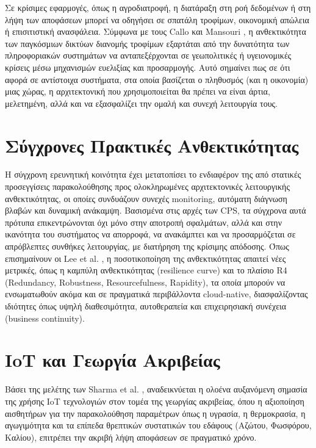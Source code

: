 Σε κρίσιμες εφαρμογές, όπως η αγροδιατροφή, η διατάραξη στη ροή δεδομένων ή στη λήψη των αποφάσεων μπορεί να οδηγήσει σε σπατάλη τροφίμων, οικονομική απώλεια ή επισιτιστική ανασφάλεια. Σύμφωνα με τους Callo και Mansouri \cite{foodsec}, η ανθεκτικότητα των παγκόσμιων δικτύων διανομής τροφίμων εξαρτάται από την δυνατότητα των πληροφοριακών συστημάτων να ανταπεξέρχονται σε γεωπολιτικές ή υγειονομικές κρίσεις μέσω μηχανισμών ευελιξίας και προσαρμογής. Αυτό σημαίνει πως σε ότι αφορά σε αντίστοιχα συστήματα, στα οποία βασίζεται ο πληθυσμός (και η οικονομία) μιας χώρας, η αρχιτεκτονική που χρησιμοποιείται θα πρέπει να είναι άρτια, μελετημένη, αλλά και να εξασφαλίζει την ομαλή και συνεχή λειτουργία τους.

\section{Σύγχρονες Πρακτικές Ανθεκτικότητας}

Η σύγχρονη ερευνητική κοινότητα έχει μετατοπίσει το ενδιαφέρον της από στατικές προσεγγίσεις παρακολούθησης προς ολοκληρωμένες αρχιτεκτονικές λειτουργικής ανθεκτικότητας, οι οποίες συνδυάζουν συνεχές monitoring, αυτόματη διάγνωση βλαβών και δυναμική ανάκαμψη. Βασισμένα στις αρχές των CPS, τα σύγχρονα αυτά πρότυπα επικεντρώνονται όχι μόνο στην αποτροπή σφαλμάτων, αλλά και στην ικανότητα του συστήματος να απορροφά, να ανακάμπτει και να προσαρμόζεται σε απρόβλεπτες συνθήκες λειτουργίας, με διατήρηση της κρίσιμης απόδοσης. Όπως επισημαίνουν οι Lee et al. \cite{cpsresilience}, η ποσοτικοποίηση της ανθεκτικότητας απαιτεί νέες μετρικές, όπως η καμπύλη ανθεκτικότητας (resilience curve) και το πλαίσιο R4 (Redundancy, Robustness, Resourcefulness, Rapidity), τα οποία μπορούν να ενσωματωθούν ακόμα και σε πραγματικά περιβάλλοντα cloud-native, διασφαλίζοντας ιδιότητες όπως υψηλή διαθεσιμότητα, αυτοθεραπεία και επιχειρησιακή συνέχεια (business continuity).

\section{IoT και Γεωργία Ακριβείας}

Βάσει της μελέτης των Sharma et al. \cite{iotagriculture}, αναδεικνύεται η ολοένα αυξανόμενη σημασία της χρήσης IoT τεχνολογιών στον τομέα της γεωργίας ακριβείας, όπου η αξιοποίηση αισθητήρων για την παρακολούθηση παραμέτρων όπως η υγρασία, η θερμοκρασία, η αγωγιμότητα και τα επίπεδα θρεπτικών συστατικών του εδάφους (Αζώτου, Φωσφόρου, Καλίου), επιτρέπει την ακριβή λήψη αποφάσεων σε πραγματικό χρόνο.


